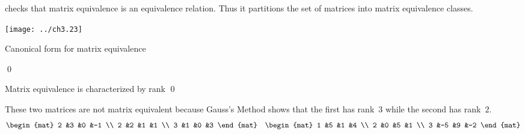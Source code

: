 \documentclass[10pt,t]{beamer}
\begin{document}
\begin{frame}
\pause
\co[le:MatEqIsSameMap]

\pause
\medskip
{} checks that
matrix equivalence is an equivalence relation.
Thus it  partitions 
the set of matrices into matrix equivalence classes.
\begin{center}
  \texttt{[image: ../ch3.23]}
\end{center}
\end{frame}




\begin{frame}{Canonical form for matrix equivalence}
\th[th:CanonFormForMatEquiv]

\pause
\medskip
{}
\end{frame}
\begin{frame}
\pf
{}
\qed
\end{frame}




\begin{frame}{Matrix equivalence is characterized by rank}
\co[co:MatrixEquivalentIffSameRank]
\pause
\pf
{}
\qed

\pause
\ex
These two matrices are not matrix equivalent 
because Gauss's Method shows
that the first has rank~$3$ while the second has rank~$2$.
\begin{equation*}
  \begin{mat}
    2  &3  &0 &-1 \\
    2  &2  &1 &1  \\
    3  &1  &0 &3
  \end{mat}
  \quad
  \begin{mat}
    1  &5  &1 &4 \\
    2  &0  &5 &1  \\
    3  &-5 &9 &-2
  \end{mat}
\end{equation*}
\end{frame}




% 
\end{document}

